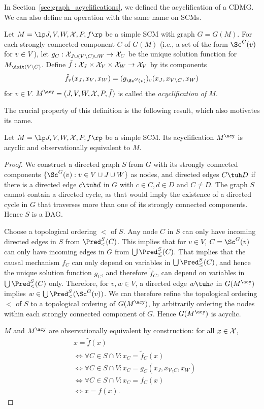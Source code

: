 In Section~\ref{sec:graph_acyclifications}, we defined the acyclification of a CDMG.
We can also define an operation with the same name on SCMs.
\begin{Def}\label{def:scm_acyclification}
  Let $M = \lt \Sin, \Send, \Srnd, \CX, P, f \rt$ be a simple SCM with graph $G = G(M)$.
  For each strongly connected component $C$ of $G(M)$ (i.e., a set of the form
  $\Sc^G(v)$ for $v \in V$), let 
  $g_C : \mathcal{X}_{J \cup (V \setminus C) \cup W} \to \mathcal{X}_C$
  be the unique solution function for $M_{\doit(\Send \setminus C)}$.
  Define $\tilde{f} : \mathcal{X}_{J} \times \mathcal{X}_{V} \times \mathcal{X}_{W} \to \mathcal{X}_{V}$ by its components
  $$\tilde{f}_v(\xJ,\xV,\xW) = (g_{\Sc^G(v)})_v(\xJ,x_{\Send\setminus C},\xW)$$
  for $v \in V$.
  $M^\acy = \ltuple \Sin, \Send, \Srnd, \CX, P, \tilde{f} \rtuple$ is called the
  \emph{acyclification of $M$}.
\end{Def}
The crucial property of this definition is the following result, which also motivates its name.
\begin{Prp}\label{prp:scm_acyclification_properties}
  Let $M = \lt \Sin, \Send, \Srnd, \CX, P, f \rt$ be a simple SCM. Its acyclification $M^\acy$ is
  acyclic and observationally equivalent to $M$.
\end{Prp}
\begin{proof}
  We construct a directed graph $S$ from $G$ with its strongly connected components $\{\Sc^G(v) : v \in \Send \cup \Sin \cup \Srnd\}$
  as nodes, and directed edges
  $C \tuh D$ if there is a directed edge $c \tuh d$ in $G$ with $c \in C, d \in D$ and $C \ne D$.
  The graph $S$ cannot contain a directed cycle, as that would imply the existence of a directed
  cycle in $G$ that traverses more than one of its strongly connected components. Hence $S$ is a DAG.
  
  Choose a topological ordering $<$ of $S$.
  Any node $C$ in $S$ can only have incoming directed edges
  in $S$ from $\Pred^S_<(C)$. This implies that for $v \in V$, $C = \Sc^G(v)$ can only have incoming
  edges in $G$ from $\bigcup \Pred^S_\le(C)$. That implies that the causal mechanism $f_C$
  can only depend on variables in $\bigcup \Pred^S_\le(C)$, and hence
  the unique solution function $g_C$, and therefore $\tilde{f}_C$, can depend on variables in $\bigcup \Pred^S_<(C)$ only.
  Therefore, for $v,w \in V$, a directed edge $w \tuh v$ in $G(M^\acy)$ implies 
  $w \in \bigcup \Pred^S_<(\Sc^G(v))$. We can therefore refine the topological ordering $<$ of $S$ 
  to a topological ordering of $G(M^\acy)$, by arbitrarily ordering the nodes within each strongly connected component
  of $G$. Hence $G(M^\acy)$ is acyclic.

  $M$ and $M^\acy$ are observationally equivalent by construction: for all $x \in \mathcal{X}$,
  \begin{align*}
  & x = \tilde{f}(x) \\
  & \iff \forall C \in S \cap V: x_C = \tilde{f}_C(x) \\
  & \iff \forall C \in S \cap V: x_C = g_C(x_J,x_{V\setminus C},x_W) \\
  & \iff \forall C \in S \cap V: x_C = f_C(x) \\
  & \iff x = f(x).
  \end{align*}
\end{proof}
